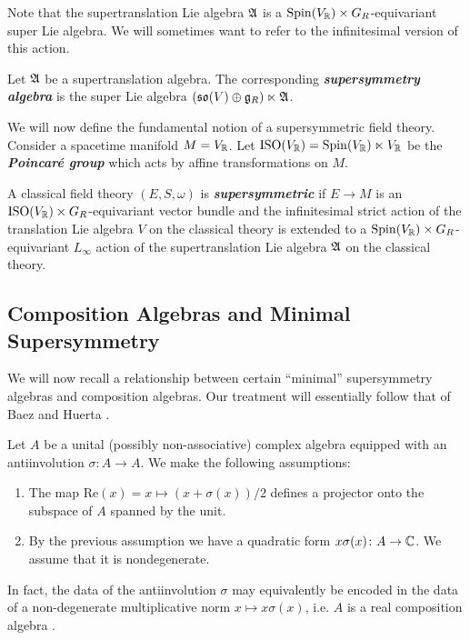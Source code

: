 \documentclass[10pt, oneside]{article}
\renewcommand{\Re}{\mathrm{Re}}
\newcommand{\defterm}[1]{\textbf{\emph{#1}}}
\begin{document}
Note that the supertranslation Lie algebra $\mathfrak A$ is a $\mathrm{Spin}(V_\mathbb R)\times G_R$-equivariant super Lie algebra.  We will sometimes want to refer to the infinitesimal version of this action.
\begin{definition}
Let $\mathfrak A$ be a supertranslation algebra.  The corresponding \defterm{supersymmetry algebra} is the super Lie algebra $(\mathfrak{so}(V) \oplus \mathfrak{g}_R) \ltimes \mathfrak A$.
\end{definition}

We will now define the fundamental notion of a supersymmetric field theory.  Consider a spacetime manifold $M=V_\mathbb R$. Let $\mathrm{ISO}(V_\mathbb R) = \mathrm{Spin}(V_\mathbb R)\ltimes V_\mathbb R$ be the \defterm{Poincar\'{e} group} which acts by affine transformations on $M$.

\begin{definition}
\label{dfn: super}
A classical field theory $(E, S, \omega)$ is \defterm{supersymmetric} if $E\rightarrow M$ is an $\mathrm{ISO}(V_\mathbb R)\times G_R$-equivariant vector bundle and the infinitesimal strict action of the translation Lie algebra $V$ on the classical theory is extended to a $\mathrm{Spin}(V_\mathbb R)\times G_R$-equivariant $L_\infty$ action of the supertranslation Lie algebra $\mathfrak A$ on the classical theory.
\end{definition}

\subsection{Composition Algebras and Minimal Supersymmetry}
\label{sect:compositionalgebras}

We will now recall a relationship between certain ``minimal'' supersymmetry algebras and composition algebras. Our treatment will essentially follow that of Baez and Huerta \cite{BaezHuerta}.

Let $A$ be a unital (possibly non-associative) complex algebra equipped with an antiinvolution $\sigma\colon A\rightarrow A$. We make the following assumptions:
\begin{enumerate}
\item The map $\Re(x)=x\mapsto (x + \sigma(x))/2$ defines a projector onto the subspace of $A$ spanned by the unit.

\item By the previous assumption we have a quadratic form $x\sigma(x)\colon A\rightarrow \mathbb C$. We assume that it is nondegenerate.
\end{enumerate}

In fact, the data of the antiinvolution $\sigma$ may equivalently be encoded in the data of a non-degenerate multiplicative norm $x\mapsto x\sigma(x)$, i.e. $A$ is a real composition algebra \cite[Chapter 1.3]{SpringerVeldkamp}.
\end{document}
